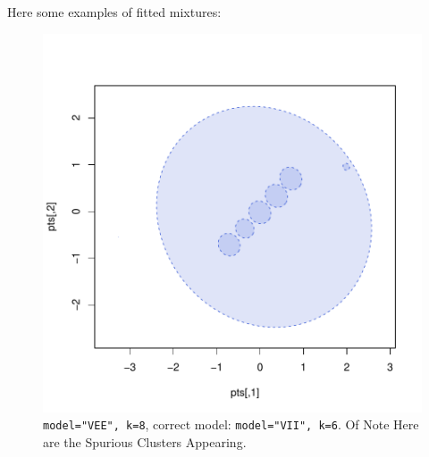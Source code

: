 Here some examples of fitted mixtures:

\begin{figure}[h!]
    \begin{Rgraph}[0.9]
\includegraphics{chapter3-fig214fit}
    \caption{{\tt model="VEE", k=8}, correct
             model: {\tt model="VII", k=6}. Of Note Here are the Spurious 
             Clusters Appearing.}%
    \label{fig:MW214bestfit}
    \end{Rgraph}
\end{figure}

